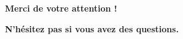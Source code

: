 \documentclass[10pt,a9paper,handout]{beamer}
\begin{document}
%
%
%
%
%     
%
%     
%     
%
%
\begin{frame}
    \begin{LARGE}
    \begin{center}
    \textbf{Merci de votre attention !}
    \vspace{0.5cm}
    
    \textbf{N'hésitez pas si vous avez des questions.}
    \end{center}
    \end{LARGE}
\end{frame}
\end{document}
